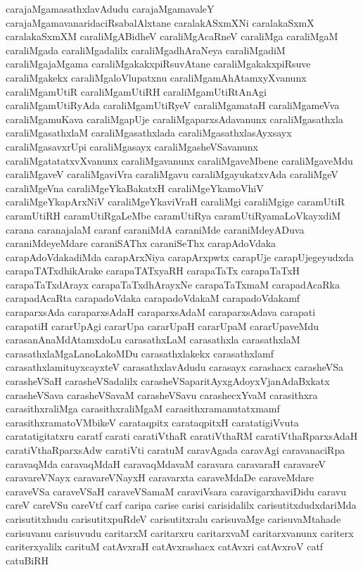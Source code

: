 {carajaMgamasathxlavAdudu
carajaMgamavaleY
carajaMgamavanaridaciRsabalAlxtane
caralakASxmXNi
caralakaSxmX
caralakaSxmXM
caraliMgABidheV
caraliMgAcaRneV
caraliMga
caraliMgaM
caraliMgada
caraliMgadalilx
caraliMgadhAraNeya
caraliMgadiM
caraliMgajaMgama
caraliMgakakxpiRsuvAtane
caraliMgakakxpiRsuve
caraliMgakekx
caraliMgaloVlupatxnu
caraliMgamAhAtamxyXvanunx
caraliMgamUtiR
caraliMgamUtiRH
caraliMgamUtiRtAnAgi
caraliMgamUtiRyAda
caraliMgamUtiRyeV
caraliMgamataH
caraliMgameVva
caraliMgamuKava
caraliMgapUje
caraliMgaparxsAdavanunx
caraliMgasathxla
caraliMgasathxlaM
caraliMgasathxlada
caraliMgasathxlasAyxsayx
caraliMgasavxrUpi
caraliMgasayx
caraliMgasheVSavanunx
caraliMgatatatxvXvanunx
caraliMgavanunx
caraliMgaveMbene
caraliMgaveMdu
caraliMgaveV
caraliMgaviVra
caraliMgavu
caraliMgayukatxvAda
caraliMgeV
caraliMgeVna
caraliMgeYkaBakatxH
caraliMgeYkamoVhiV
caraliMgeYkapArxNiV
caraliMgeYkaviVraH
caraliMgi
caraliMgige
caramUtiR
caramUtiRH
caramUtiRgaLeMbe
caramUtiRya
caramUtiRyamaLoVkayxdiM
carana
caranajalaM
caranf
caraniMdA
caraniMde
caraniMdeyADuva
caraniMdeyeMdare
caraniSAThx
caraniSeThx
carapAdoVdaka
carapAdoVdakadiMda
carapArxNiya
carapArxpwtx
carapUje
carapUjegeyudxda
carapaTATxdhikArake
carapaTATxyaRH
carapaTaTx
carapaTaTxH
carapaTaTxdArayx
carapaTaTxdhArayxNe
carapaTaTxmaM
carapadAcaRka
carapadAcaRta
carapadoVdaka
carapadoVdakaM
carapadoVdakamf
caraparxsAda
caraparxsAdaH
caraparxsAdaM
caraparxsAdava
carapati
carapatiH
cararUpAgi
cararUpa
cararUpaH
cararUpaM
cararUpaveMdu
carasanAnaMdAtamxdoLu
carasathxLaM
carasathxla
carasathxlaM
carasathxlaMgaLanoLakoMDu
carasathxlakekx
carasathxlamf
carasathxlamituyxcayxteV
carasathxlavAdudu
carasayx
carashacx
carasheVSa
carasheVSaH
carasheVSadalilx
carasheVSaparitAyxgAdoyxVjanAdaBxkatx
carasheVSava
carasheVSavaM
carasheVSavu
carashecxYvaM
carasithxra
carasithxraliMga
carasithxraliMgaM
carasithxramanutatxmamf
carasithxramatoVMbikeV
carataqpitx
carataqpitxH
caratatigiVvuta
caratatigitatxru
caratf
carati
caratiVthaR
caratiVthaRM
caratiVthaRparxsAdaH
caratiVthaRparxsAdw
caratiVti
caratuM
caravAgada
caravAgi
caravanaciRpa
caravaqMda
caravaqMdaH
caravaqMdavaM
caravara
caravaraH
caravareV
caravareVNayx
caravareVNayxH
caravarxta
caraveMdaDe
caraveMdare
caraveVSa
caraveVSaH
caraveVSamaM
caraviVsara
caravigarxhaviDidu
caravu
careV
careVSu
careVtf
carf
caripa
carise
carisi
carisidalilx
carisutitxdudxdariMda
carisutitxhudu
carisutitxpuRdeV
carisutitxralu
carisuvaMge
carisuvaMtahade
carisuvanu
carisuvudu
caritarxM
caritarxru
caritarxvaM
caritarxvanunx
cariterx
cariterxyalilx
carituM
catAvxraH
catAvxrashacx
catAvxri
catAvxroV
catf
catuBiRH
}
